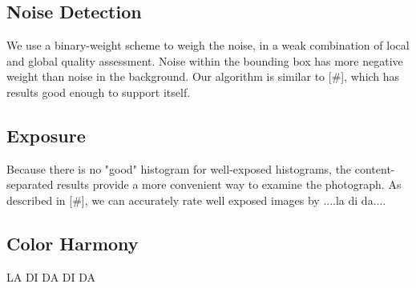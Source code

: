 \documentclass[twocolumn]{article}
\begin{document}
\subsection{Noise Detection}
We use a binary-weight scheme to weigh the noise, in a weak combination of local and global quality assessment. Noise within the bounding box has more negative weight than noise in the background. Our algorithm is similar to [\#], which has results good enough to support itself.

\subsection{Exposure}
Because there is no "good" histogram for well-exposed histograms, the content-separated results provide a more convenient way to examine the photograph. As described in [\#], we can accurately rate well exposed images by ....la di da....

\subsection{Color Harmony}
LA DI DA DI DA



\end{document}
